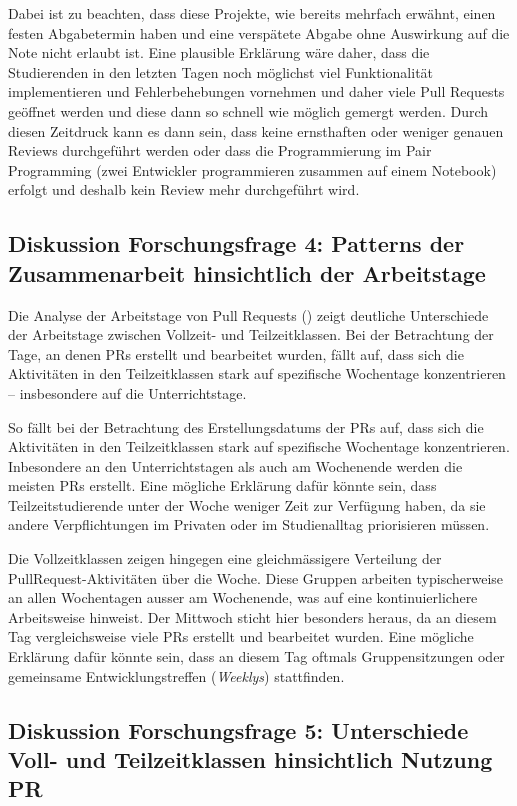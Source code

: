 Dabei ist zu beachten, dass diese Projekte, wie bereits mehrfach erwähnt, einen festen Abgabetermin haben und eine verspätete Abgabe ohne Auswirkung auf die Note nicht erlaubt ist. Eine plausible Erklärung wäre daher, dass die Studierenden in den letzten Tagen noch möglichst viel Funktionalität implementieren und Fehlerbehebungen vornehmen und daher viele Pull Requests geöffnet werden und diese dann so schnell wie möglich gemergt werden. Durch diesen Zeitdruck kann es dann sein, dass keine ernsthaften oder weniger genauen Reviews durchgeführt werden oder dass die Programmierung im Pair Programming (zwei Entwickler programmieren zusammen auf einem Notebook) erfolgt und deshalb kein Review mehr durchgeführt wird.

\subsection{Diskussion Forschungsfrage 4: Patterns der Zusammenarbeit hinsichtlich der Arbeitstage}
Die Analyse der Arbeitstage von Pull Requests () zeigt deutliche Unterschiede der Arbeitstage zwischen Vollzeit- und Teilzeitklassen. Bei der Betrachtung der Tage, an denen PRs erstellt und bearbeitet wurden, fällt auf, dass sich die Aktivitäten in den Teilzeitklassen stark auf spezifische Wochentage konzentrieren – insbesondere auf die Unterrichtstage. 

So fällt bei der Betrachtung des Erstellungsdatums der PRs auf, dass sich die Aktivitäten in den Teilzeitklassen stark auf spezifische Wochentage konzentrieren. Inbesondere an den Unterrichtstagen als auch am Wochenende werden die meisten PRs erstellt. Eine mögliche Erklärung dafür könnte sein, dass Teilzeitstudierende unter der Woche weniger Zeit zur Verfügung haben, da sie andere Verpflichtungen im Privaten oder im Studienalltag priorisieren müssen.

Die Vollzeitklassen zeigen hingegen eine gleichmässigere Verteilung der PullRequest-Aktivitäten über die Woche. Diese Gruppen arbeiten typischerweise an allen Wochentagen ausser am Wochenende, was auf eine kontinuierlichere Arbeitsweise hinweist. Der Mittwoch sticht hier besonders heraus, da an diesem Tag vergleichsweise viele PRs erstellt und bearbeitet wurden. Eine mögliche Erklärung dafür könnte sein, dass an diesem Tag oftmals Gruppensitzungen oder gemeinsame Entwicklungstreffen (\textit{Weeklys}) stattfinden.

\subsection{Diskussion Forschungsfrage 5: Unterschiede Voll- und Teilzeitklassen hinsichtlich Nutzung PR}
